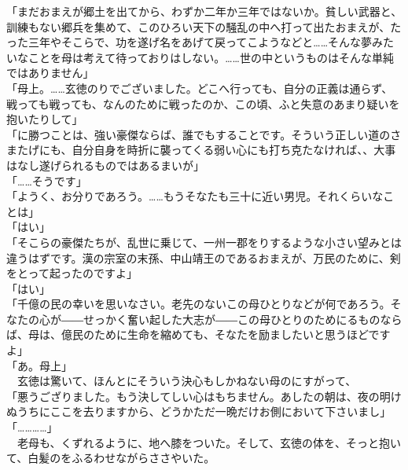 \documentclass[
  paper=a5,
  fontsize=10pt,
  jafontsize=9.5pt,
  tate,                  %
  open_bracket_pos=nibu, %
]{jlreq}
\begin{document}
「まだおまえが郷土を出てから、わずか二年か三年ではないか。貧しい武器と、訓練もない郷兵を集めて、このひろい天下の騒乱の中へ打って出たおまえが、たった三年やそこらで、功を遂げ名をあげて戻ってこようなどと……そんな夢みたいなことを母は考えて待っておりはしない。……世の中というものはそんな単純ではありません」\\


「母上。……玄徳のりでございました。どこへ行っても、自分の正義は通らず、戦っても戦っても、なんのために戦ったのか、この頃、ふと失意のあまり疑いを抱いたりして」\\


「に勝つことは、強い豪傑ならば、誰でもすることです。そういう正しい道のさまたげにも、自分自身を時折に襲ってくる弱い心にも打ち克たなければ、、大事はなし遂げられるものではあるまいが」\\


「……そうです」\\


「ようく、お分りであろう。……もうそなたも三十に近い男児。それくらいなことは」\\


「はい」\\


「そこらの豪傑たちが、乱世に乗じて、一州一郡をりするような小さい望みとは違うはずです。漢の宗室の末孫、中山靖王のであるおまえが、万民のために、剣をとって起ったのですよ」\\


「はい」\\


「千億の民の幸いを思いなさい。老先のないこの母ひとりなどが何であろう。そなたの心が――せっかく奮い起した大志が――この母ひとりのためにるものならば、母は、億民のために生命を縮めても、そなたを励ましたいと思うほどですよ」\\


「あ。母上」\\


　玄徳は驚いて、ほんとにそういう決心もしかねない母のにすがって、\\


「悪うござりました。もう決してしい心はもちません。あしたの朝は、夜の明けぬうちにここを去りますから、どうかただ一晩だけお側において下さいまし」\\


「…………」\\


　老母も、くずれるように、地へ膝をついた。そして、玄徳の体を、そっと抱いて、白髪のをふるわせながらささやいた。\\
\end{document}
